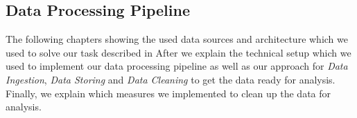 \subsection{Data Processing Pipeline}
\label{subsec:pipeline}

The following chapters showing the used data sources and architecture which we used to solve our task described in 
After  we explain the technical setup which we used to implement our data processing pipeline as well as
our approach for \textit{Data Ingestion}, \textit{Data Storing} and \textit{Data Cleaning} to get the data ready for analysis.
Finally, we explain which measures we implemented to clean up the data for analysis.








